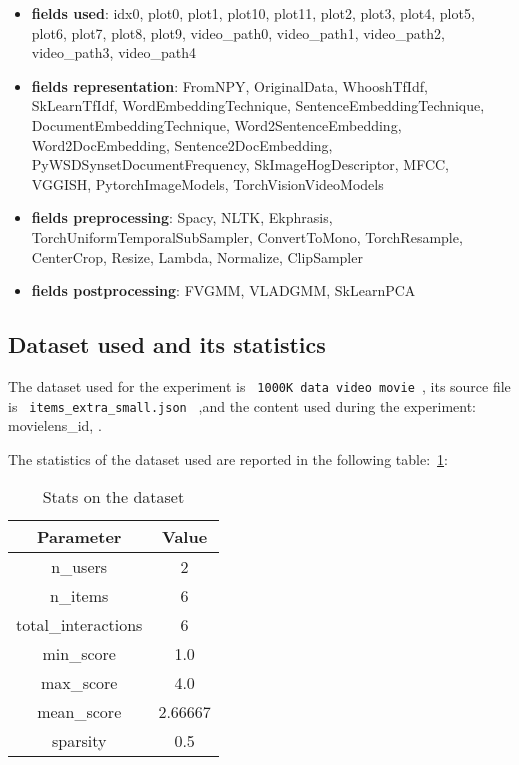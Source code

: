 \documentclass[11pt]{article}
\begin{document}
\begin{itemize}
    \item \textbf{fields used}:  idx0, plot0, plot1, plot10, plot11, plot2, plot3, plot4, plot5, plot6, plot7, plot8, plot9, video\_path0, video\_path1, video\_path2, video\_path3, video\_path4

    \item \textbf{fields representation}:  FromNPY, OriginalData, WhooshTfIdf, SkLearnTfIdf, WordEmbeddingTechnique, SentenceEmbeddingTechnique, DocumentEmbeddingTechnique, Word2SentenceEmbedding, Word2DocEmbedding, Sentence2DocEmbedding, PyWSDSynsetDocumentFrequency, SkImageHogDescriptor, MFCC, VGGISH, PytorchImageModels, TorchVisionVideoModels

    \item \textbf{fields preprocessing}:  Spacy, NLTK, Ekphrasis, TorchUniformTemporalSubSampler, ConvertToMono, TorchResample, CenterCrop, Resize, Lambda, Normalize, ClipSampler

    \item \textbf{fields postprocessing}:  FVGMM, VLADGMM, SkLearnPCA
\end{itemize}





\hfill\break
\subsection{Dataset used and its statistics}
The dataset used for the experiment is  \lstinline[style=verbatim-text]| 1000K data video movie |,
its source file is \lstinline[style=verbatim-text]| items_extra_small.json | ,and the content used during the experiment:
     movielens\_id,
.


The statistics of the dataset used are reported in the following table:~\ref{tab:dataset_table}:
\begin{table}[ht]
    \centering
  \begin{tabular}{|c|c|}
    \hline
    \textbf{Parameter}& \textbf{Value} \\ \hline
    n\_users  & 2\\ \hline
    n\_items  & 6\\ \hline
    total\_interactions  & 6\\ \hline
    min\_score  & 1.0\\ \hline
    max\_score  & 4.0\\ \hline
    mean\_score  & 2.66667\\ \hline
    sparsity  & 0.5\\ \hline
  \end{tabular}
   \caption{Stats on the dataset}\label{tab:dataset_table}
\end{table}
\end{document}

